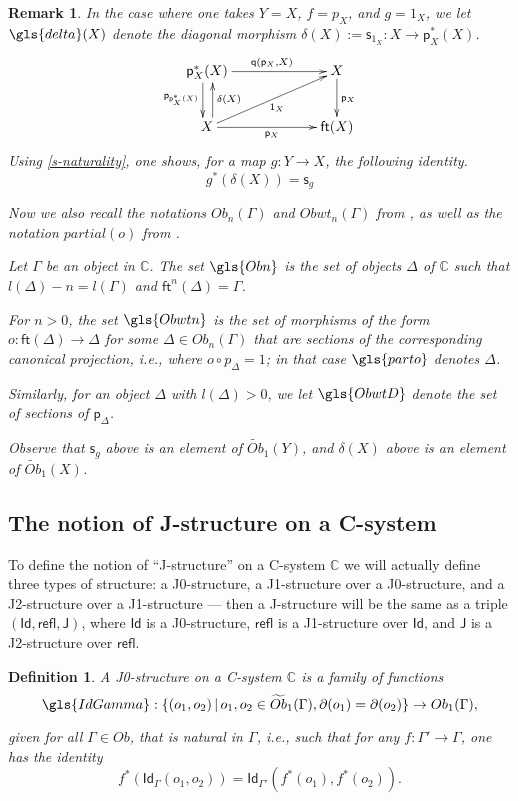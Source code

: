 \documentclass[12pt]{article}
\numberwithin{equation}{section}
\newenvironment{eq}{\begin{equation}}{\end{equation}}
\newtheorem{definition}[proposition]{Definition}
\newtheorem{remark}[proposition]{Remark}
\newcommand{\sr}{\rightarrow}
\newcommand{\wt}{\widetilde}
\newcommand{\CC}{{\mathbb C}}  %
\newcommand{\id}{1}            %
\newcommand{\ft}{\mathsf{ft}}
\newcommand{\p}{\mathsf{p}}
\newcommand{\q}{\mathsf{q}}
\newcommand{\s}{\mathsf{s}}     %
\newcommand{\Id}{\mathsf{Id}} %
\newcommand{\refl}{\mathsf{refl}}
\newcommand{\J}{\mathsf{J}}
\newcommand{\Ob}{Ob}
\newcommand{\Obwt}{\wt{Ob}}
\begin{document}
\begin{remark}
  In the case where one takes $Y=X$, $f=p_X$, and $g = 1_X$, we let $\gls{delta}(X)$ denote
  the diagonal morphism $\delta(X) := \s_{\id_X} : X\sr \p_X^*(X)$.
  \begin{eq}
    \xymatrix@C=5pc{
      \p_X^*(X) \ar[r]^{\q(\p_X,X)} \ar@<-3pt>[d]_{\p_{\p_X^*(X)}} & X \ar[d]^{\p_X} \\
      X \ar[ru]_{1_X} \ar[r]_{\p_X} \ar@<-4pt>[u]_{\delta(X)} & \ft(X)
    }
  \end{eq}%
  Using \eqref{s-naturality}, one shows, for a map $g : Y \to X$, the following identity.
  \begin{eq}
    \label{delta-pullback}
    g^* (\delta(X)) = \s_g
  \end{eq}%

  Now we also recall the notations ${{Ob}}_n(\Gamma)$ and
  $Obwt_n(\Gamma)$ from \cite[\S 3]{fromunivwithPiI}, as well as the
  notation ${partial}(o)$ from \cite[\S 3]{Csubsystems}.

  Let $\Gamma$ be an object in $\CC$.  The set $\gls{Obn}$ is the set of
  objects $\Delta$ of $\CC$ such that $l(\Delta)-n = l(\Gamma)$ and
  $\ft^n(\Delta) = \Gamma$.

  For $n>0$, the set $\gls{Obwtn}$ is the set of morphisms of the form
  $o : \ft(\Delta) \sr \Delta$ for some $\Delta \in \Ob_n(\Gamma)$ that are sections
  of the corresponding canonical projection, i.e., where $o \circ p_\Delta = \id$;
  in that case $\gls{parto}$ denotes $\Delta$.

  Similarly, for an object $\Delta$ with $l(\Delta) > 0$, we let
  $\gls{ObwtD}$ denote the set of sections of $\p_\Delta$.

  Observe that $\s_g$ above is an element of $\Obwt_1(Y)$, and $\delta(X)$ above
  is an element of $\Obwt_1(X)$.
\end{remark}

\subsection{The notion of J-structure on a C-system}
%


To define the notion of ``J-structure'' on a C-system $\CC$ we will actually define three types of
structure: a J0-structure, a J1-structure over a J0-structure, and a J2-structure
over a J1-structure --- then a J-structure will be the same as a triple
$(\Id,\refl,\J)$, where $\Id$ is a J0-structure, $\refl$ is a J1-structure over
$\Id$, and $\J$ is a J2-structure over $\refl$.

\begin{definition}
\label{2015.03.27.def1}
A {\em J0-structure} on a C-system $\CC$ is a family of functions 
%
$$\gls{IdGamma}:\{(o_1,o_2)\,|\,o_1, o_2 \in \Obwt_1(\Gamma), \partial(o_1)=\partial(o_2)\}\sr Ob_1(\Gamma),$$

given for all $\Gamma\in Ob$, that is natural in $\Gamma$, i.e., such that for any
$f:\Gamma'\sr \Gamma$, one has the identity
\begin{eq}
  \label{Id-naturality}
  f^*(\Id_{\Gamma}(o_1,o_2))=\Id_{\Gamma'}(f^*(o_1),f^*(o_2)).
\end{eq}%
\end{definition}
\end{document}
